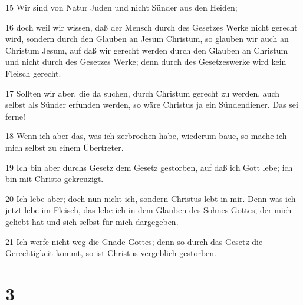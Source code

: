\par 15 Wir sind von Natur Juden und nicht Sünder aus den Heiden;
\par 16 doch weil wir wissen, daß der Mensch durch des Gesetzes Werke nicht gerecht wird, sondern durch den Glauben an Jesum Christum, so glauben wir auch an Christum Jesum, auf daß wir gerecht werden durch den Glauben an Christum und nicht durch des Gesetzes Werke; denn durch des Gesetzeswerke wird kein Fleisch gerecht.
\par 17 Sollten wir aber, die da suchen, durch Christum gerecht zu werden, auch selbst als Sünder erfunden werden, so wäre Christus ja ein Sündendiener. Das sei ferne!
\par 18 Wenn ich aber das, was ich zerbrochen habe, wiederum baue, so mache ich mich selbst zu einem Übertreter.
\par 19 Ich bin aber durchs Gesetz dem Gesetz gestorben, auf daß ich Gott lebe; ich bin mit Christo gekreuzigt.
\par 20 Ich lebe aber; doch nun nicht ich, sondern Christus lebt in mir. Denn was ich jetzt lebe im Fleisch, das lebe ich in dem Glauben des Sohnes Gottes, der mich geliebt hat und sich selbst für mich dargegeben.
\par 21 Ich werfe nicht weg die Gnade Gottes; denn so durch das Gesetz die Gerechtigkeit kommt, so ist Christus vergeblich gestorben.

\chapter{3}

